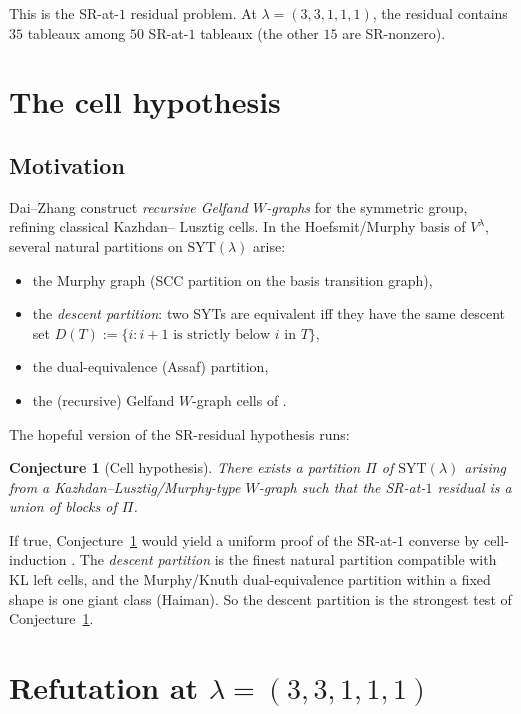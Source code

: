 \documentclass[11pt]{article}
\newtheorem{conjecture}[theorem]{Conjecture}
\theoremstyle{definition}
\newcommand{\la}{\lambda}
\newcommand{\SYT}{\mathrm{SYT}}
\begin{document}
This is the SR-at-$1$ residual problem. At $\la = (3,3,1,1,1)$, the
residual contains $35$ tableaux among $50$ SR-at-$1$ tableaux (the
other $15$ are SR-nonzero).

\section{The cell hypothesis}

\subsection{Motivation}
Dai--Zhang \cite{DaiZhang} construct \emph{recursive Gelfand
$W$-graphs} for the symmetric group, refining classical Kazhdan--
Lusztig cells. In the Hoefsmit/Murphy basis of $V^\la$, several
natural partitions on $\SYT(\la)$ arise:
\begin{itemize}
\item the Murphy graph (SCC partition on the basis transition graph),
\item the \emph{descent partition}: two SYTs are equivalent iff they
have the same descent set $D(T) := \{i : i+1 \text{ is strictly
below } i \text{ in } T\}$,
\item the dual-equivalence (Assaf) partition,
\item the (recursive) Gelfand $W$-graph cells of \cite{DaiZhang}.
\end{itemize}
The hopeful version of the SR-residual hypothesis runs:

\begin{conjecture}[Cell hypothesis]\label{conj:cell}
There exists a partition $\Pi$ of $\SYT(\la)$ arising from a
Kazhdan--Lusztig/Murphy-type $W$-graph such that the SR-at-$1$
residual is a union of blocks of $\Pi$.
\end{conjecture}

If true, Conjecture~\ref{conj:cell} would yield a uniform proof of
the SR-at-$1$ converse by cell-induction \cite{DaiZhang}. The
\emph{descent partition} is the finest natural partition compatible
with KL left cells, and the Murphy/Knuth dual-equivalence partition
within a fixed shape is one giant class (Haiman). So the descent
partition is the strongest test of Conjecture~\ref{conj:cell}.

\section{Refutation at $\la = (3,3,1,1,1)$}
\end{document}
